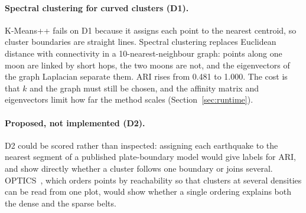 \paragraph{Spectral clustering for curved clusters (D1).} %
K-Means++ fails on D1 because it assigns each point to the nearest centroid, so cluster boundaries
are straight lines. Spectral clustering replaces Euclidean distance with connectivity in a
10-nearest-neighbour graph: points along one moon are linked by short hops, the two moons are
not, and the eigenvectors of the graph Laplacian separate them. ARI rises from 0.481 to 1.000. The
cost is that $k$ and the graph must still be chosen, and the affinity matrix and eigenvectors limit
how far the method scales (Section~\ref{sec:runtime}).
\paragraph{Proposed, not implemented (D2).} D2 could be scored rather than inspected: assigning each
earthquake to the nearest segment of a published plate-boundary model would give labels for ARI, and
show directly whether a cluster follows one boundary or joins several. OPTICS~\cite{ankerst1999}, which
orders points by reachability so that clusters at several densities can be read from one plot, would
show whether a single ordering explains both the dense and the sparse belts.
